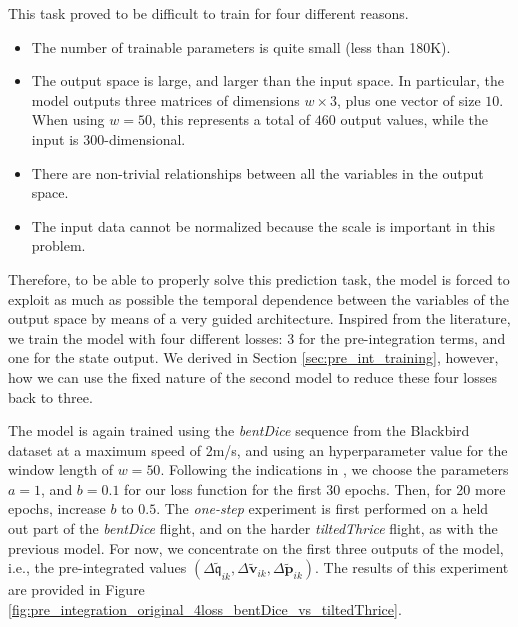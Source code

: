 This task proved to be difficult to train for four different reasons.
\begin{itemize}
    \item The number of trainable parameters is quite small (less than 180K).
    \item The output space is large, and larger than the input space. In particular, the model outputs three matrices of dimensions $w\times3$, plus one vector of size $10$. 
    When using $w=50$, this represents a total of $460$ output values, while the input is $300$-dimensional.
    \item There are non-trivial relationships between all the variables in the output space.
    \item The input data cannot be normalized because the scale is important in this problem.
\end{itemize}
Therefore, to be able to properly solve this prediction task, the model is forced to exploit as much as possible the temporal dependence between the variables of the output space by means of a very guided architecture.
Inspired from the literature, we train the model with four different losses: 3 for the pre-integration terms, and one for the state output. 
We derived in Section \ref{sec:pre_int_training}, however, how we can use the fixed nature of the second model to reduce these four losses back to three. 

The model is again trained using the \emph{bentDice} sequence from the Blackbird dataset at a maximum speed of 2m/s, and using an hyperparameter value for the window length of $w=50$.
Following the indications in \cite{DBLP:journals/corr/ClarkWWMT17}, we choose the parameters $a=1$, and $b=0.1$ for our loss function for the first 30 epochs. 
Then, for 20 more epochs, increase $b$ to $0.5$. 
The \emph{one-step} experiment is first performed on a held out part of the \emph{bentDice} flight, and on the harder \emph{tiltedThrice} flight, as with the previous model.
For now, we concentrate on the first three outputs of the model, i.e., the pre-integrated values $(\Delta\mathfrak{\tilde{q}}_{ik}, \Delta\mathbf{\tilde{v}}_{ik}, \Delta\mathbf{\tilde{p}}_{ik})$. The results of this experiment are provided in Figure \ref{fig:pre_integration_original_4loss_bentDice_vs_tiltedThrice}.

